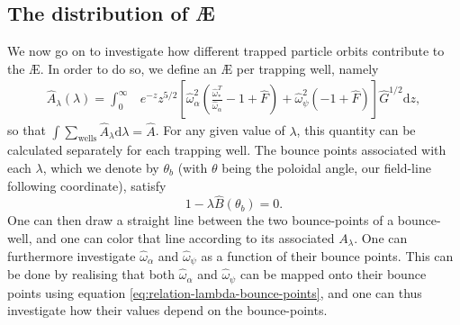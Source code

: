 \subsection{The distribution of \AE{}}
We now go on to investigate how different trapped particle orbits contribute to the \AE{}. In order to do so, we define an \AE{} per trapping well, namely
\begin{equation}
    \begin{aligned}
        \widehat{A}_\lambda(\lambda) = \int_0^\infty & e^{-z} z^{5/2}  \left[ \hat{\omega}_{\alpha}^2 \left( \frac{ \hat{\omega}_{*}^T }{\hat{\omega}_{\alpha}} - 1 +  \hat{F} \right) + \hat{\omega}_{\psi}^2 \left( -1 + \hat{F} \right)  \right] \hat{G}^{1/2} \mathrm{d}z,
    \end{aligned}
    \label{eq:ae-per-lam}
\end{equation}
so that $\int \sum_{\mathrm{wells}} \widehat{A}_\lambda \mathrm{d} \lambda = \widehat{A}$.
For any given value of $\lambda$, this quantity can be calculated separately for each trapping well. The  bounce points associated with each $\lambda$, which we denote by $\theta_b$ (with $\theta$ being the poloidal angle, our field-line following coordinate), satisfy 
\begin{equation}
    1 - \lambda \hat{B}(\theta_b) = 0.
    \label{eq:relation-lambda-bounce-points}
\end{equation}
One can then draw a straight line between the two bounce-points of a bounce-well, and one can color that line according to its associated $A_\lambda$. One can furthermore investigate $\hat{\omega}_\alpha$ and $\hat{\omega}_\psi$ as a function of their bounce points. This can be done by realising that both $\hat{\omega}_\alpha$ and $\hat{\omega}_\psi$ can be mapped onto their bounce points using equation \eqref{eq:relation-lambda-bounce-points}, and one can thus investigate how their values depend on the bounce-points.
\par 
